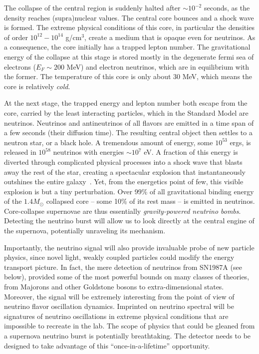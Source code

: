 The collapse of the central region is suddenly halted after $\sim 10^{-2}$ seconds, as the density reaches (supra)nuclear values. The central core bounces and a shock wave is formed. The extreme physical conditions of this core, in particular the densities of order $10^{12}-10^{14}$ g/cm$^{3}$, create a medium that is opaque even for neutrinos. As a consequence, the core initially has a trapped lepton number. The gravitational energy of the collapse at this stage is stored mostly in the degenerate fermi sea of electrons ($E_{F}\sim 200$ MeV) and electron neutrinos, which are in equilibrium with the former. The temperature of this core is only about 30 MeV, which means the core is relatively \emph{cold}. 

At the next stage, the trapped energy and lepton number both escape from the core, carried by the least interacting particles, which in the Standard Model are neutrinos.  Neutrinos and antineutrinos of all flavors are emitted in a time span of a few seconds (their diffusion time). The resulting central object then settles to a neutron star, or a black hole. A tremendous amount of energy, some $10^{53}$ ergs, is released in $10^{58}$ neutrinos with energies $\sim 10^{7}$ eV. A fraction of this energy is diverted through complicated physical processes into a shock wave that blasts away the rest of the star, creating a spectacular explosion that instantaneously outshines the entire galaxy~\cite{Janka:2012wk}. Yet, from the energetics point of few, this visible explosion is but a tiny perturbation. Over 99\% of all gravitational binding energy of the $1.4 M_{\odot}$ collapsed core -- some 10\% of its rest mass -- is emitted in neutrinos. Core-collapse supernovae are thus essentially \emph{gravity-powered neutrino bombs}.  Detecting the neutrino burst will allow us to look directly at the central engine of the supernova, potentially unraveling its mechanism. 

Importantly, the neutrino signal will also provide invaluable probe of new particle physics, since novel light, weakly coupled particles could modify the energy transport picture. In fact, the mere detection of neutrinos from SN1987A (see below), provided some of the most powerful bounds on many classes of theories, from Majorons and other Goldstone bosons to extra-dimensional states. Moreover, the signal will be extremely interesting from the point of view of neutrino flavor oscillation dynamics. Imprinted on neutrino spectral will be signatures of neutrino oscillations in extreme physical conditions that are impossible to recreate in the lab. The scope of physics that could be gleaned from a supernova neutrino burst is potentially breathtaking. The detector needs to be designed to take advantage of this ``once-in-a-lifetime'' opportunity.



